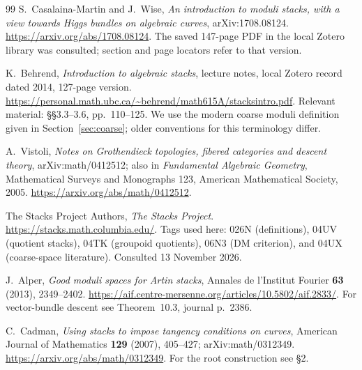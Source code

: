 \documentclass[11pt,a4paper]{article}
\numberwithin{equation}{section}
\theoremstyle{definition}
\begin{document}
\begin{thebibliography}{99}
S.~Casalaina-Martin and J.~Wise,
\emph{An introduction to moduli stacks, with a view towards Higgs bundles
on algebraic curves}, arXiv:1708.08124.
\url{https://arxiv.org/abs/1708.08124}.
The saved 147-page PDF in the local Zotero library was consulted;
section and page locators refer to that version.

K.~Behrend, \emph{Introduction to algebraic stacks}, lecture notes,
local Zotero record dated 2014, 127-page version.
\url{https://personal.math.ubc.ca/~behrend/math615A/stacksintro.pdf}.
Relevant material: \S\S3.3--3.6, pp.~110--125. We use the modern coarse
moduli definition given in Section~\ref{sec:coarse}; older conventions
for this terminology differ.

A.~Vistoli, \emph{Notes on Grothendieck topologies, fibered categories
and descent theory}, arXiv:math/0412512; also in
\emph{Fundamental Algebraic Geometry}, Mathematical Surveys and
Monographs 123, American Mathematical Society, 2005.
\url{https://arxiv.org/abs/math/0412512}.

The Stacks Project Authors, \emph{The Stacks Project}.
\url{https://stacks.math.columbia.edu/}.
Tags used here: 026N (definitions), 04UV (quotient stacks),
04TK (groupoid quotients), 06N3 (DM criterion), and 04UX (coarse-space
literature). Consulted 13 November 2026.

J.~Alper, \emph{Good moduli spaces for Artin stacks},
Annales de l'Institut Fourier \textbf{63} (2013), 2349--2402.
\url{https://aif.centre-mersenne.org/articles/10.5802/aif.2833/}.
For vector-bundle descent see Theorem~10.3, journal p.~2386.

C.~Cadman, \emph{Using stacks to impose tangency conditions on curves},
American Journal of Mathematics \textbf{129} (2007), 405--427;
arXiv:math/0312349.
\url{https://arxiv.org/abs/math/0312349}.
For the root construction see \S2.
\end{thebibliography}
\end{document}
